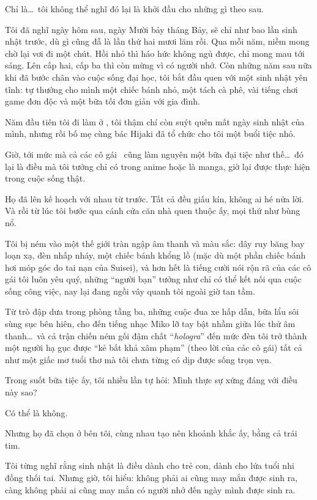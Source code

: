 \documentclass[../main.tex]{subfiles}
\begin{document}
Chỉ là\dots\ tôi không thể nghĩ đó lại là khởi đầu cho những gì theo sau.

Tôi đã nghĩ ngày hôm sau, ngày Mười bảy tháng Bảy, sẽ chỉ như bao lần sinh nhật trước, dù gì cũng đẫ là lần thứ hai mươi lăm rồi. Qua mỗi năm, niềm mong chờ lại vơi đi một chút. Hồi nhỏ thì háo hức không ngủ được, chỉ mong mau tới sáng. Lên cấp hai, cấp ba thì còn mừng vì có người nhớ. Còn những năm sau nữa khi đã bước chân vào cuộc sống đại học, tôi bắt đầu quen với một sinh nhật yên tĩnh: tự thưởng cho mình một chiếc bánh nhỏ, một tách cà phê, vài tiếng chơi game đơn độc và một bữa tối đơn giản với gia đình.

Năm đầu tiên tôi đi làm ở \hll, tôi thậm chí còn suýt quên mất ngày sinh nhật của mình, nhưng rồi bố mẹ cùng bác Hijaki đã tổ chức cho tôi một buổi tiệc nhỏ.

Giờ, tới mức mà cả các cô gái \hll\ cũng làm nguyên một bữa đại tiệc như thế\dots\ đó lại là điều mà tôi tưởng chỉ có trong anime hoặc là manga, giờ lại được thực hiện trong cuộc sống thật.

Họ đã lên kế hoạch với nhau từ trước. Tất cả đều giấu kín, không ai hé nửa lời. Và rồi từ lúc tôi bước qua cánh cửa căn nhà quen thuộc ấy, mọi thứ như bùng nổ.

Tôi bị ném vào một thế giới tràn ngập âm thanh và màu sắc: dây ruy băng bay loạn xạ, đèn nhấp nháy, một chiếc bánh khổng lồ (mặc dù một phần chiếc bánh hơi móp góc do tai nạn của Suisei), và hơn hết là tiếng cười nói rộn rã của các cô gái tôi luôn yêu quý, những ``người bạn'' tưởng như chỉ có thể kết nối qua cuộc sống công việc, nay lại đang ngồi vây quanh tôi ngoài giờ tan tầm.

Từ trò đập dưa trong phòng tầng ba, những cuộc đua xe hấp dẫn, bữa lẩu sôi sùng sục bên hiên, cho đến tiếng nhạc Miko lỡ tay bật nhầm giữa lúc thử âm thanh\dots\ và cả trận chiến ném gối đậm chất ``\textit{hologra}'' đến mức đèn tôi trở thành một người hạ gục được ``kẻ bất khả xâm phạm'' (theo lời của các cô gái) tất cả như một giấc mơ tuổi thơ mà tôi chưa từng có dịp được sống trọn vẹn.

Trong suốt bữa tiệc ấy, tôi nhiều lần tự hỏi: Mình thực sự xứng đáng với điều này sao?

Có thể là không.

Nhưng họ đã chọn ở bên tôi, cùng nhau tạo nên khoảnh khắc ấy, bằng cả trái tim.

Tôi từng nghĩ rằng sinh nhật là điều dành cho trẻ con, dành cho lứa tuổi nhi đồng thối tai. Nhưng giờ, tôi hiểu: không phải ai cũng may mắn được sinh ra, càng không phải ai cũng may mắn có người nhớ đến ngày mình được sinh ra.
\end{document}
